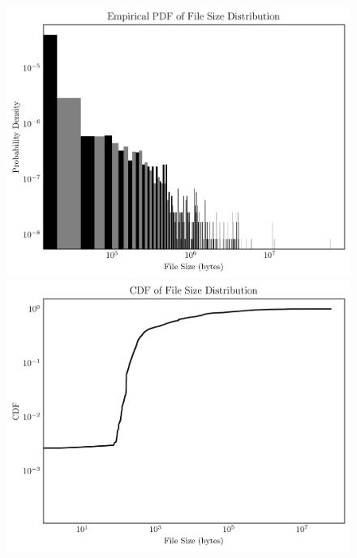 \documentclass{article}
\begin{document}
\begin{figure}[htbp]
\centering

\begin{minipage}{.5\linewidth}
\centering
{}
\includegraphics[width=\linewidth]{./images/file_size_pdf.png}
\end{minipage}%
\begin{minipage}{.5\linewidth}
\centering
{}
\includegraphics[width=\linewidth]{./images/file_size_cdf.png}
\end{minipage}

\end{figure}
\end{document}
